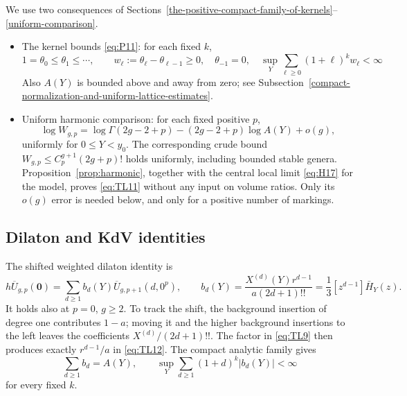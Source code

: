 We use two consequences of
Sections~\ref{the-positive-compact-family-of-kernels}--\ref{uniform-comparison}.

\begin{itemize}
\item
  The kernel bounds \eqref{eq:P11}: for each fixed \(k\), \begin{equation}
1=\theta_0\le\theta_1\le\cdots,
   \qquad w_\ell:=\theta_\ell-\theta_{\ell-1}\ge0,
   \quad\theta_{-1}=0,
   \quad\sup_Y\sum_{\ell\ge0}(1+\ell)^k w_\ell<\infty
   \label{eq:TL10}
\end{equation} Also \(A(Y)\) is bounded above and away from
  zero; see Subsection~\ref{compact-normalization-and-uniform-lattice-estimates}.
\item
  Uniform harmonic comparison: for each fixed positive \(p\), \begin{equation}
\log W_{g,p}=
   \log\Gamma(2g-2+p)-(2g-2+p)\log A(Y)+o(g),
   \label{eq:TL11}
\end{equation} uniformly for \(0\le Y<y_0\). The corresponding crude bound
  \(W_{g,p}\le C_p^{g+1}(2g+p)!\) holds uniformly, including bounded
  stable genera. Proposition~\ref{prop:harmonic}, together with the
  central local limit \eqref{eq:H17} for the model, proves
  \eqref{eq:TL11} without any input on volume ratios. Only its \(o(g)\)
  error is needed below, and only for a positive number of markings.
\end{itemize}

\subsection{Dilaton and KdV identities}\label{exact-dilaton-and-genus-exchange-identities}

The shifted weighted dilaton identity is \begin{equation}
h\overline U_{g,p}(\mathbf0)=
 \sum_{d\ge1}b_d(Y)\overline U_{g,p+1}(d,0^p),
 \qquad
 b_d(Y)=\frac{X^{(d)}(Y)r^{d-1}}{a(2d+1)!!}
 =\frac13[z^{d-1}]\bar H_Y(z).
 \label{eq:TL12}
\end{equation} It holds also at \(p=0\), \(g\ge2\). To track the shift, the
background insertion of degree one contributes \(1-a\); moving it and
the higher background insertions to the left leaves the coefficients
\(X^{(d)}/(2d+1)!!\). The factor in \eqref{eq:TL9} then produces exactly
\(r^{d-1}/a\) in \eqref{eq:TL12}. The compact analytic family gives \begin{equation}
\sum_{d\ge1}b_d=A(Y),\qquad
 \sup_Y\sum_{d\ge1}(1+d)^k|b_d(Y)|<\infty
 \label{eq:TL13}
\end{equation} for every fixed \(k\).

